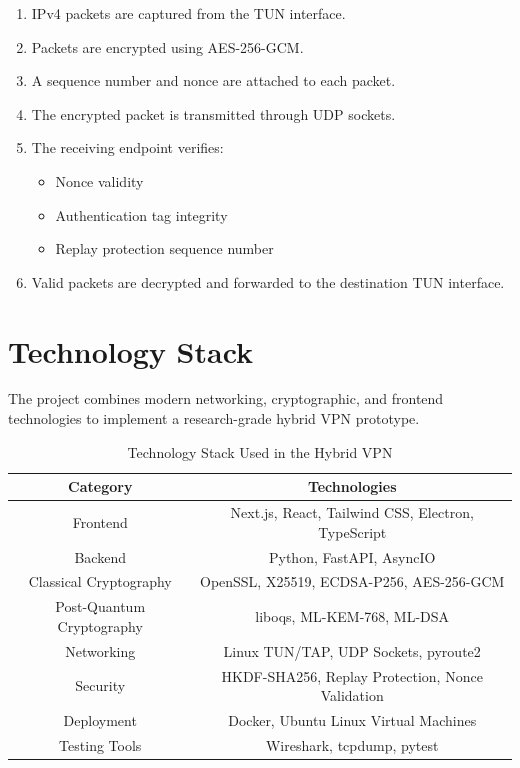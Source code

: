 \begin{enumerate}
    \item IPv4 packets are captured from the TUN interface.

    \item Packets are encrypted using AES-256-GCM.

    \item A sequence number and nonce are attached to each packet.

    \item The encrypted packet is transmitted through UDP sockets.

    \item The receiving endpoint verifies:
    \begin{itemize}
        \item Nonce validity
        \item Authentication tag integrity
        \item Replay protection sequence number
    \end{itemize}

    \item Valid packets are decrypted and forwarded to the destination TUN interface.
\end{enumerate}

\section{Technology Stack}

The project combines modern networking, cryptographic, and frontend technologies to implement a research-grade hybrid VPN prototype.

\begin{table}[H]
\centering
\caption{Technology Stack Used in the Hybrid VPN}
\begin{tabular}{|c|c|}
\hline
\textbf{Category} & \textbf{Technologies} \\
\hline
Frontend & Next.js, React, Tailwind CSS, Electron, TypeScript \\
\hline
Backend & Python, FastAPI, AsyncIO \\
\hline
Classical Cryptography & OpenSSL, X25519, ECDSA-P256, AES-256-GCM \\
\hline
Post-Quantum Cryptography & liboqs, ML-KEM-768, ML-DSA \\
\hline
Networking & Linux TUN/TAP, UDP Sockets, pyroute2 \\
\hline
Security & HKDF-SHA256, Replay Protection, Nonce Validation \\
\hline
Deployment & Docker, Ubuntu Linux Virtual Machines \\
\hline
Testing Tools & Wireshark, tcpdump, pytest \\
\hline
\end{tabular}
\label{tab:tech-stack}
\end{table}

